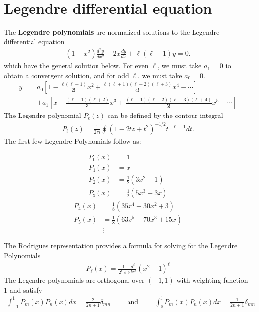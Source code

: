 \section{Legendre differential equation}
The \textbf{Legendre polynomials} are normalized solutions to the Legendre differential equation
\begin{align}
	(1-x^2)\frac{d^2y}{dx^2}-2x\frac{dy}{dx}+\ell(\ell+1)y=0.
\end{align}
which have the general solution below. For even $\ell$, we must take $a_1 = 0$ to obtain a convergent solution, and for odd $\ell$, we must take $a_0 = 0$.
\begin{align}
	y=&a_0\left[1-\frac{\ell(\ell+1)}{2!}x^2+\frac{\ell(\ell+1)(\ell-2)(\ell+3)}{4!}x^4-\cdots\right] \\&+a_1\left[x-\frac{(\ell-1)(\ell+2)}{3!}x^3+\frac{(\ell-1)(\ell+2)(\ell-3)(\ell+4)}{5!}x^5-\cdots\right]
\end{align}
The Legendre polynomial $P_\ell(z)$ can be defined by the contour integral
\begin{align}
	P_\ell(z) = \frac{1}{2\pi i}\oint (1-2tz+t^2)^{-1/2}t^{-\ell-1} dt.
\end{align}
The first few Legendre Polynomials follow as:
\begin{multicols}{2}
	\noindent
\begin{align}
	P_0(x) &=1 \\
	P_1(x) &= x \\
	P_2(x) &= \frac{1}{2}(3x^2-1) \\
	P_3(x) &= \frac{1}{2}(5x^3 -3x) 
\end{align}
\begin{align}
	P_4(x) &= \frac{1}{8}(35x^4 - 30x^2 +3) \\
	P_5(x) &= \frac{1}{8}(63x^5-70x^3+15x) \\
	&\vdots \nonumber
\end{align}
\end{multicols}
The Rodrigues representation provides a formula for solving for the Legendre Polynomials
\begin{align}
	P_\ell(x) = \frac{1}{2^\ell \ell!}\frac{d^\ell}{dx^\ell}(x^2-1)^\ell
\end{align}
The Legendre polynomials are orthogonal over $(-1,1)$ with weighting function 1 and satisfy
\begin{align}
	\int_{-1}^{1}P_m(x)P_n(x)dx = \frac{2}{2n+1}\delta_{mn} \hspace{1cm} \textrm{and}\hspace{1cm}	\int_{0}^{1}P_m(x)P_n(x)dx = \frac{1}{2n+1}\delta_{mn}
\end{align} 
